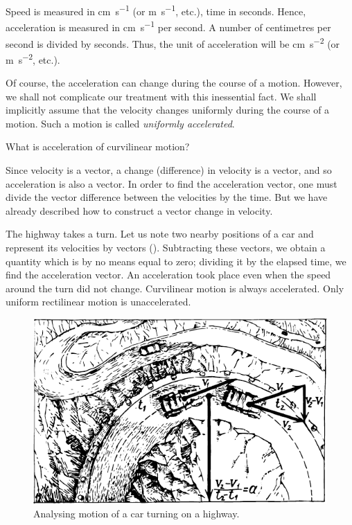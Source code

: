 Speed is measured in \si{\centi\meter\per\second} (or \si{\meter\per\second}, etc.), time in seconds. Hence, acceleration is measured in \si{\centi\meter\per\second} per second. A number of centimetres per second is divided by seconds. Thus, the unit of acceleration will be \si{\centi\meter\per\second\squared}
(or \si{\meter\per\second\squared}, etc.).

Of course, the acceleration can change during the course
of a motion. However, we shall not complicate our treatment with this inessential fact. We shall implicitly assume that the velocity changes uniformly during the course of a motion. Such a motion is called \emph{uniformly accelerated}.

What is acceleration of curvilinear motion? 

Since velocity is a vector, a change (difference) in velocity is a vector, and so acceleration is also a vector. In order to find the acceleration vector, one must divide the vector difference between the velocities by the time. But we have already described how to construct a vector change in velocity.

The highway takes a turn. Let us note two nearby
positions of a car and represent its velocities by vectors
(). Subtracting these vectors, we obtain a
quantity which is by no means equal to zero; dividing
it by the elapsed time, we find the acceleration vector.
An acceleration took place even when the speed around
the turn did not change. Curvilinear motion is always
accelerated. Only uniform rectilinear motion is unaccelerated.
\begin{figure}[!ht]
\centering
\includegraphics[width=\textwidth]{figures/fig-02-02.pdf}
\caption{Analysing motion of a car turning on a highway.}
\label{fig-2.02}
\end{figure}

